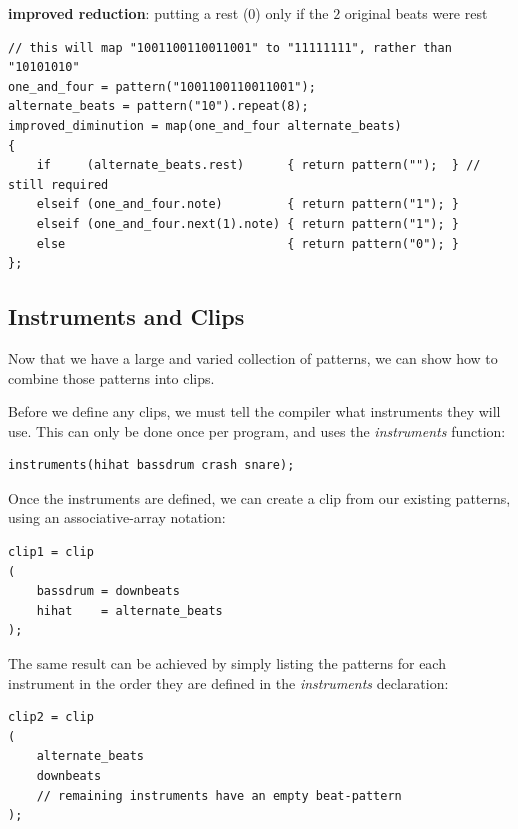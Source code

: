 \documentclass[11pt,twoside]{article}
\begin{document}
\textbf{improved reduction}: putting a rest (0) only if the $2$ original beats were rest
\begin{verbatim}
// this will map "1001100110011001" to "11111111", rather than "10101010"
one_and_four = pattern("1001100110011001");
alternate_beats = pattern("10").repeat(8);
improved_diminution = map(one_and_four alternate_beats)
{
    if     (alternate_beats.rest)      { return pattern("");  } // still required
    elseif (one_and_four.note)         { return pattern("1"); }
    elseif (one_and_four.next(1).note) { return pattern("1"); }
    else                               { return pattern("0"); }
};
\end{verbatim}

\subsection{Instruments and Clips}

Now that we have a large and varied collection of patterns, we can show how to combine those patterns into clips.  

Before we define any clips, we must tell the compiler what instruments they will use.  This can only be done once per program, and uses the \textit{instruments} function:

\begin{verbatim}
instruments(hihat bassdrum crash snare);
\end{verbatim}

Once the instruments are defined, we can create a clip from our existing patterns, using an
associative-array notation:

\begin{verbatim}
clip1 = clip
(
    bassdrum = downbeats
    hihat    = alternate_beats
);
\end{verbatim}

The same result can be achieved by simply listing the patterns for each instrument in the order they are defined in the \textit{instruments} declaration:
\begin{verbatim}
clip2 = clip
(
    alternate_beats
    downbeats
    // remaining instruments have an empty beat-pattern
);

\end{verbatim}
\end{document}
